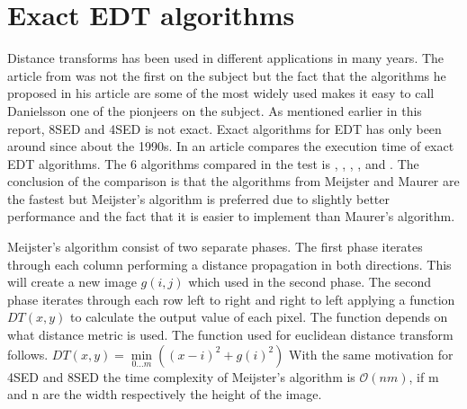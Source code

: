 \section{Exact EDT algorithms}\label{exactEDT}
Distance transforms has been used in different applications in many years. The article from \citet{Danielsson} was not the first on the subject but the fact that the algorithms he proposed in his article are some of the most widely used\citep{edtcompare} makes it easy to call Danielsson one of the pionjeers on the subject. As mentioned earlier in this report, 8SED and 4SED is not exact. Exact algorithms for EDT has only been around since about the 1990s. In an article \citet{edtcompare} compares the execution time of exact EDT algorithms. The 6 algorithms compared in the test is \citet{meijster}, \citet{maurer}, \citet{eggers}, \citet{lotufo}, \citet{cuisenaire} and \citet{saito}. The conclusion of the comparison is that the algorithms from Meijster and Maurer are the fastest but Meijster's algorithm is preferred due to slightly better performance and the fact that it is easier to implement than Maurer's algorithm.

Meijster's algorithm consist of two separate phases. The first phase iterates through each column performing a distance propagation in both directions. This will create a new image \begin{math}g(i, j)\end{math} which used in the second phase. The second phase iterates through each row left to right and right to left applying a function \begin{math}DT(x, y)\end{math} to calculate the output value of each pixel. The function depends on what distance metric is used. The function used for euclidean distance transform follows.\vspace{\baselineskip}\newline
\begin{math}
	DT(x, y) = \min\limits_{0\dots m}((x-i)^2+g(i)^2)
\end{math}\vspace{\baselineskip}\newline
With the same motivation for 4SED and 8SED the time complexity of Meijster's algorithm is $\mathcal{O}(nm)$, if m and n are the width respectively the height of the image.

